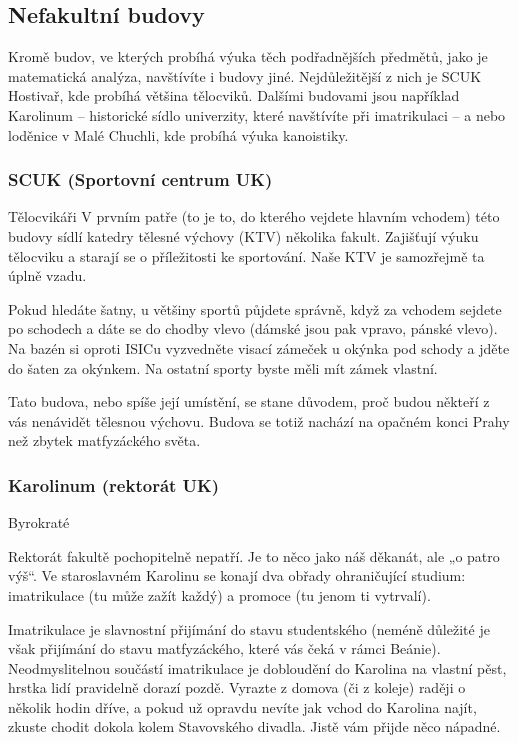 \subsection{Nefakultní budovy}
Kromě budov, ve kterých probíhá výuka těch podřadnějších předmětů, jako je matematická analýza, navštívíte i budovy
jiné. Nejdůležitější z nich je SCUK Hostivař, kde probíhá většina tělocviků. Dalšími budovami jsou například Karolinum –
historické sídlo univerzity, které navštívíte při imatrikulaci – a nebo loděnice v Malé Chuchli, kde probíhá výuka
kanoistiky.


\subsubsection{SCUK (Sportovní centrum UK)}

{Tělocvikáři}
V prvním patře (to je to, do kterého vejdete hlavním vchodem) této budovy sídlí katedry tělesné výchovy (KTV) několika
fakult. Zajišťují výuku tělocviku a starají se o příležitosti ke sportování. Naše KTV je samozřejmě ta úplně vzadu.

Pokud hledáte šatny, u většiny sportů půjdete správně, když za vchodem sejdete po schodech a dáte se do chodby vlevo
(dámské jsou pak vpravo, pánské vlevo). Na bazén si oproti ISICu vyzvedněte visací zámeček u okýnka pod schody a jděte
do šaten za okýnkem. Na ostatní sporty byste měli mít zámek vlastní.

Tato budova, nebo spíše její umístění, se stane důvodem, proč budou někteří z vás nenávidět tělesnou výchovu. Budova se
totiž nachází na opačném konci Prahy než zbytek matfyzáckého světa.


\subsubsection{Karolinum (rektorát UK)}

{Byrokraté}

Rektorát fakultě pochopitelně nepatří. Je to něco jako náš děkanát, ale „o patro výš“. Ve staroslavném Karolinu se
konají dva obřady ohraničující studium: imatrikulace (tu může zažít každý) a promoce (tu jenom ti vytrvalí).

Imatrikulace je slavnostní přijímání do stavu studentského (neméně důležité je však přijímání do stavu matfyzáckého,
které vás čeká v rámci Beánie). Neodmyslitelnou součástí imatrikulace je dobloudění do Karolina na vlastní pěst, hrstka
lidí pravidelně dorazí pozdě. Vyrazte z domova (či z koleje) raději o několik hodin dříve, a pokud už opravdu nevíte jak
vchod do Karolina najít, zkuste chodit dokola kolem Stavovského divadla. Jistě vám přijde něco nápadné.



